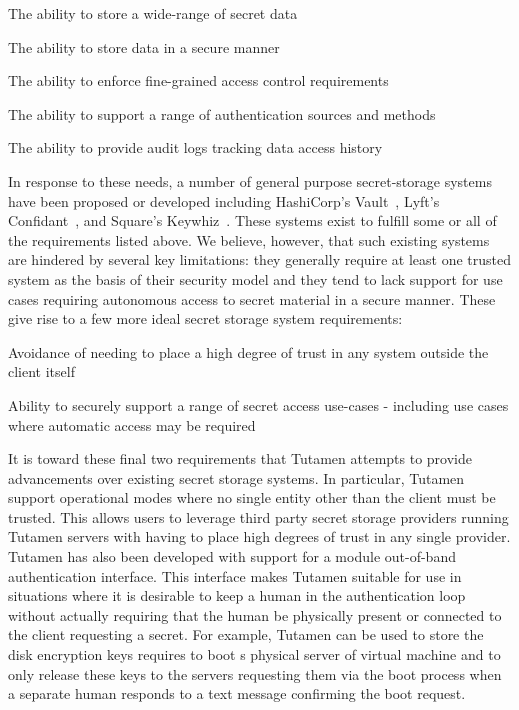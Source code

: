 \begin{packed_item}
\item The ability to store a wide-range of secret data
\item The ability to store data in a secure manner
\item The ability to enforce fine-grained access control requirements
\item The ability to support a range of authentication sources and methods
\item The ability to provide audit logs tracking data access history
\end{packed_item}

In response to these needs, a number of general purpose secret-storage
systems have been proposed or developed including HashiCorp's
Vault~\cite{vault}, Lyft's Confidant~\cite{confidant}, and Square's
Keywhiz~\cite{keywhiz}. These systems exist to fulfill some or all of
the requirements listed above. We believe, however, that such existing
systems are hindered by several key limitations: they generally
require at least one trusted system as the basis of their security
model and they tend to lack support for use cases requiring autonomous
access to secret material in a secure manner. These give rise to a few
more ideal secret storage system requirements:

\begin{packed_item}
\item Avoidance of needing to place a high degree of trust in any
  system outside the client itself
\item Ability to securely support a range of secret access use-cases -
  including use cases where automatic access may be required
\end{packed_item}

It is toward these final two requirements that Tutamen attempts to
provide advancements over existing secret storage systems. In
particular, Tutamen support operational modes where no single entity
other than the client must be trusted. This allows users to leverage
third party secret storage providers running Tutamen servers with
having to place high degrees of trust in any single provider. Tutamen
has also been developed with support for a module out-of-band
authentication interface. This interface makes Tutamen suitable for
use in situations where it is desirable to keep a human in the
authentication loop without actually requiring that the human be
physically present or connected to the client requesting a secret. For
example, Tutamen can be used to store the disk encryption keys
requires to boot s physical server of virtual machine and to only
release these keys to the servers requesting them via the boot process
when a separate human responds to a text message confirming the boot
request.


